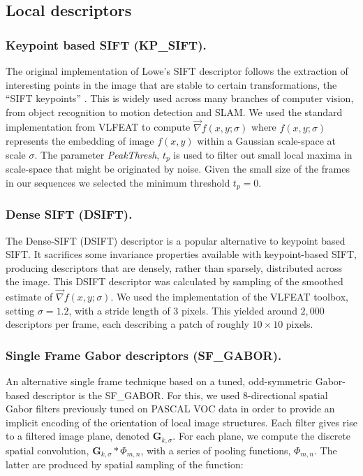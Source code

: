 \subsection{Local descriptors}
\label{sec:descriptors}

\subsubsection{Keypoint based SIFT (KP\_SIFT).}

The original implementation of Lowe's SIFT descriptor follows the extraction of interesting points in the image that are stable to certain transformations, the ``SIFT keypoints'' \cite{Lowe2004}. This is widely used across many branches of computer vision, from object recognition to motion detection and SLAM. We used the standard implementation from VLFEAT \cite{Vedaldi2008} to compute $\vec{\nabla}f(x,y;\sigma)$ where $f(x,y;\sigma)$ represents the embedding of image $f(x,y)$ within a Gaussian scale-space at scale $\sigma$. The parameter \emph{PeakThresh}, $t_p$ is used to filter out small local maxima in scale-space that might be originated by noise. Given the small size of the frames in our sequences we selected the minimum threshold $t_p = 0$.

\subsubsection{Dense SIFT (DSIFT).}

The Dense-SIFT (DSIFT) descriptor \citep{Lazebnik2006} is a popular  alternative to keypoint based SIFT. It sacrifices some invariance properties available with keypoint-based SIFT, producing descriptors that are densely, rather than sparsely, distributed across the image. This DSIFT descriptor was calculated by  sampling of the smoothed estimate of $\vec{\nabla}f(x,y;\sigma)$.  We used the implementation of the VLFEAT toolbox, setting $\sigma = 1.2$, with a stride length of 3 pixels. This  yielded around $2,000$ descriptors per frame, each describing a patch of roughly $10 \times 10$ pixels.  \\

\subsubsection{Single Frame Gabor descriptors (SF\_GABOR).}

An alternative single frame technique based on a tuned, odd-symmetric Gabor-based descriptor is the SF\_GABOR. For this, we used $8$-directional spatial Gabor filters previously tuned on PASCAL VOC data \cite{Everingham2009} in order to provide an implicit encoding of the orientation of local image structures.  Each filter gives rise to a filtered image plane, denoted $\mathbf{G}_{k,\sigma}$.  For each plane, we compute the discrete spatial convolution, $\mathbf{G}_{k,\sigma} \ast {\Phi}_{m,n}$, with a series of pooling functions, ${\Phi}_{m,n}$. The latter are produced by spatial sampling of the function:


